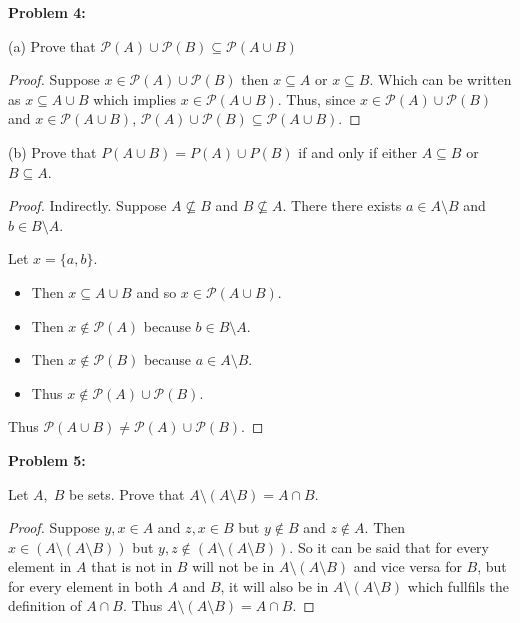 \documentclass{article}
\begin{document}
    \textbf{Problem 4:}

    (a) Prove that $\mathcal{P}(A) \cup \mathcal{P}(B) \subseteq \mathcal{P}(A\cup B)$

    \begin{proof}
        Suppose $x\in \mathcal{P}(A) \cup \mathcal{P}(B)$ then $x\subseteq A$ or 
        $x\subseteq B$. Which can be written as $x\subseteq A\cup B$ which implies
        $x\in \mathcal{P}(A\cup B)$. Thus, since $x\in \mathcal{P}(A) \cup \mathcal{P}(B)$
        and $x\in \mathcal{P}(A\cup B)$, 
        $\mathcal{P}(A) \cup \mathcal{P}(B) \subseteq \mathcal{P}(A\cup B)$.
    \end{proof}

    (b) Prove that $P(A \cup B) = P(A) \cup P(B)$ if and only if either 
    $A \subseteq B$ or $B \subseteq A$.

    \begin{proof}
        Indirectly. Suppose $A\nsubseteq B$ and $B\nsubseteq A$. There there exists
        $a\in A\setminus B$ and $b\in B\setminus A$. 

        Let $x=\{a,b\}$. 
        \begin{itemize}
            \item Then $x\subseteq A\cup B$ and so $x\in\mathcal{P}(A\cup B)$.
            \item Then $x\notin \mathcal{P}(A)$ because $b\in B\setminus A$.
            \item Then $x\notin \mathcal{P}(B)$ because $a\in A\setminus B$.
            \item Thus $x\notin \mathcal{P}(A)\cup\mathcal{P}(B)$.
        \end{itemize}
        Thus $\mathcal{P}(A\cup B) \neq \mathcal{P}(A)\cup\mathcal{P}(B)$.
    \end{proof}


    \textbf{Problem 5:}

    Let $A,\; B$ be sets. Prove that $A \setminus (A \setminus B) = A \cap B$.

    \begin{proof}

        Suppose $y,x\in A$ and $z,x\in B$ but $y\notin B$ and $z\notin A$. Then
        $x\in (A \setminus (A \setminus B))$ but $y,z\notin (A \setminus (A \setminus B))$.
        So it can be said that for every element in $A$ that is not in $B$ will not be in
        $A \setminus (A \setminus B)$ and vice versa for $B$, but for every element in both
        $A$ and $B$, it will also be in $A \setminus (A \setminus B)$ which fullfils the
        definition of $A\cap B$. Thus $A \setminus (A \setminus B) = A \cap B$.
    \end{proof}
\end{document}
